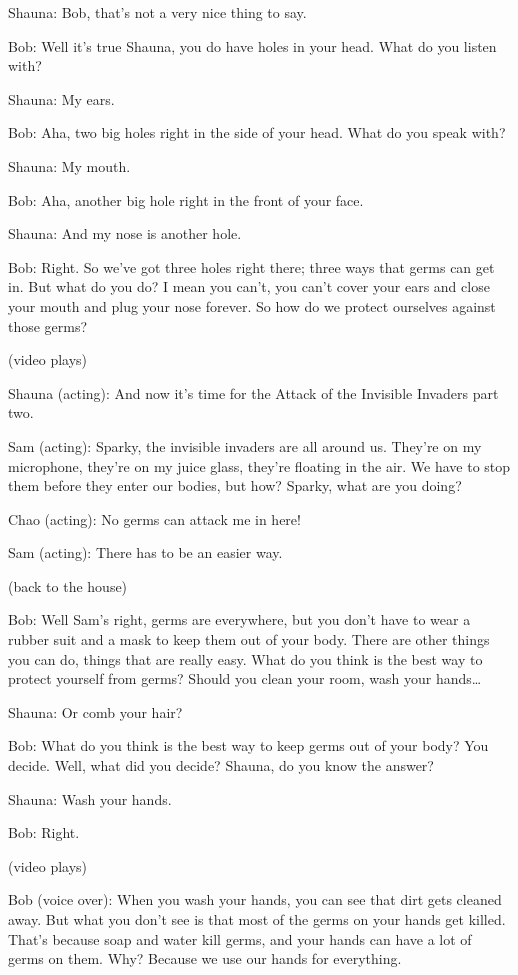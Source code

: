 Shauna: Bob, that's not a very nice thing to say.

Bob: Well it's true Shauna, you do have holes in your head. What do you listen with?

Shauna: My ears.

Bob: Aha, two big holes right in the side of your head. What do you speak with?

Shauna: My mouth.

Bob: Aha, another big hole right in the front of your face.

Shauna: And my nose is another hole.

Bob: Right. So we've got three holes right there; three ways that germs can get in. But what do you do? I mean you can't, you can't cover your ears and close your mouth and plug your nose forever. So how do we protect ourselves against those germs?

(video plays)

Shauna (acting): And now it's time for the Attack of the Invisible Invaders part two.

Sam (acting): Sparky, the invisible invaders are all around us. They're on my microphone, they're on my juice glass, they're floating in the air. We have to stop them before they enter our bodies, but how? Sparky, what are you doing?

Chao (acting): No germs can attack me in here!

Sam (acting): There has to be an easier way.

(back to the house)

Bob: Well Sam's right, germs are everywhere, but you don't have to wear a rubber suit and a mask to keep them out of your body. There are other things you can do, things that are really easy. What do you think is the best way to protect yourself from germs? Should you clean your room, wash your hands\dots

Shauna: Or comb your hair?

Bob: What do you think is the best way to keep germs out of your body? You decide. Well, what did you decide? Shauna, do you know the answer?

Shauna: Wash your hands.

Bob: Right.

(video plays)

Bob (voice over): When you wash your hands, you can see that dirt gets cleaned away. But what you don't see is that most of the germs on your hands get killed. That's because soap and water kill germs, and your hands can have a lot of germs on them. Why? Because we use our hands for everything.

